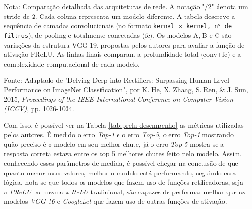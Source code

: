 \begin{table}
\begin{threeparttable}
        \begin{tablenotes}[para]
            \small
            \item[] Nota: Comparação detalhada das arquiteturas de rede. A notação "/2" denota um stride de 2. Cada coluna representa um modelo diferente. A tabela descreve a sequência de camadas convolucionais (no formato \texttt{kernel $\times$ kernel, n° de filtros}), de pooling e totalmente conectadas (fc). Os modelos A, B e C são variações da estrutura VGG-19, propostas pelos autores para avaliar a função de ativação PReLU. As linhas finais comparam a profundidade total (conv+fc) e a complexidade computacional de cada modelo.
            \item[] Fonte: Adaptado de "Delving Deep into Rectifiers: Surpassing Human-Level Performance on ImageNet Classification", por K. He, X. Zhang, S. Ren, \& J. Sun, 2015, \textit{Proceedings of the IEEE International Conference on Computer Vision (ICCV)}, pp. 1026-1034.
        \end{tablenotes}
        
    \end{threeparttable}
\end{table}

 Com isso, é possível ver na Tabela \ref{tab:prelu-desempenho} as métricas utilizadas pelos autores. É medido o erro \textit{Top-1} e o erro \textit{Top-5}, o erro \textit{Top-1} mostrando quão preciso é o modelo em seu melhor chute, já o erro \textit{Top-5} mostra se a resposta correta estava entre os top 5 melhores chutes feito pelo modelo. Assim, conhecendo esses parâmetros de medida, é possível chegar na conclusão de que quanto menor esses valores, melhor o modelo está performando, seguindo essa lógica, nota-se que todos os modelos que fazem uso de funções retificadoras, seja a \textit{PReLU} ou mesmo a \textit{ReLU} tradicional, são capazes de performar melhor que os modelos \textit{VGG-16} e \textit{GoogleLet} que fazem uso de outras funções de ativação.

